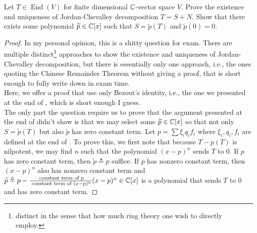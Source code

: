 \documentclass{report}
\begin{document}
\begin{question}{}{}
Let $T \in \operatorname{End}(V)$ for finite dimensional $\mathbb{C}$-vector space  $V$. Prove the existence and uniqueness of Jordan-Chevalley decomposition $T=S+N$. Show that there exists some polynomial $\widetilde{p}  \in \mathbb{C} [x]$ such that $S=\tilde{p} (T)$ and $\tilde{p} (0)=0$.
\end{question}
\begin{proof}
In my personal opinion, this is a shitty question for exam. There are multiple distinct\footnote{distinct in the sense that how much ring theory one wish to directly employ.} approaches to show the existence and uniqueness of Jordan-Chevalley decomposition, but there is essentially only one approach, i.e., the ones quoting the Chinese Remainder Theorem without giving a proof, that is short enough to fully write down in exam time.\\ 

Here, we offer a proof that use only Bezout's identity, i.e., the one we presented at the end of , which is short enough I guess.\\ 


The only part the question require us to prove that the argument presented at the end of  didn't show is that we may select some $\widetilde{p}  \in \mathbb{C} [x]$ so that not only $S=\tilde{p} (T)$ but also  $\tilde{p} $ has zero constant term. Let $p=\sum \xi_i q_i f_i$ where $\xi_i,q_i,f_i$ are defined at the end of . To prove this, we first note that because $T-p(T)$ is nilpotent, we may find $n$ such that the polynomial  $(x-p)^n$ sends $T$ to $0$. If $p$ has zero constant term, then  $\tilde{p}\triangleq p$ suffice. If $p$ has nonzero constant term, then  $(x-p)^n$ also has nonzero constant term and $\widetilde{p}\triangleq p- \frac{\text{ constant term of $p$}}{\text{ constant term of }(x-p)^n}(x-p)^n \in \mathbb{C} [x]$ is a polynomial that sends $T$ to $0$ and has zero constant term.  
\end{proof}
\end{document}
